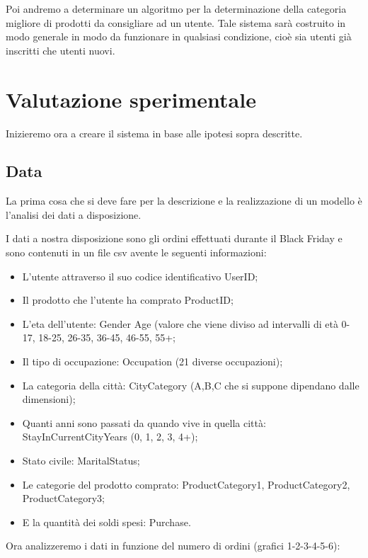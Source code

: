 \documentclass{article}
\begin{document}
Poi andremo a determinare un algoritmo per la determinazione della categoria migliore di prodotti da consigliare ad un utente. Tale sistema sarà costruito in modo generale in modo da funzionare in qualsiasi condizione, cioè sia utenti già inscritti che utenti nuovi.

\section{Valutazione sperimentale}
Inizieremo ora a creare il sistema in base alle ipotesi sopra descritte.

\subsection{Data}
La prima cosa che si deve fare per la descrizione e la realizzazione di un modello è l'analisi dei dati a disposizione.

I dati a nostra disposizione sono gli ordini effettuati durante il Black Friday e sono contenuti in un file csv avente le seguenti informazioni:
\begin{itemize}
\item L'utente attraverso il suo codice identificativo UserID;
\item Il prodotto che l'utente ha comprato ProductID;
\item L'eta dell'utente: Gender Age (valore che viene diviso ad intervalli di età 0-17, 18-25, 26-35, 36-45, 46-55, 55+;
\item Il tipo di occupazione: Occupation (21 diverse occupazioni);
\item La categoria della città:  CityCategory (A,B,C che si suppone dipendano dalle dimensioni);
\item Quanti anni sono passati da quando vive in quella città: StayInCurrentCityYears (0, 1, 2, 3, 4+);
\item Stato civile: MaritalStatus;
\item Le categorie del prodotto comprato: ProductCategory1, ProductCategory2, ProductCategory3;
\item E la quantità dei soldi spesi: Purchase.
\end{itemize}

Ora analizzeremo i dati in funzione del numero di ordini (grafici 1-2-3-4-5-6):
\end{document}
